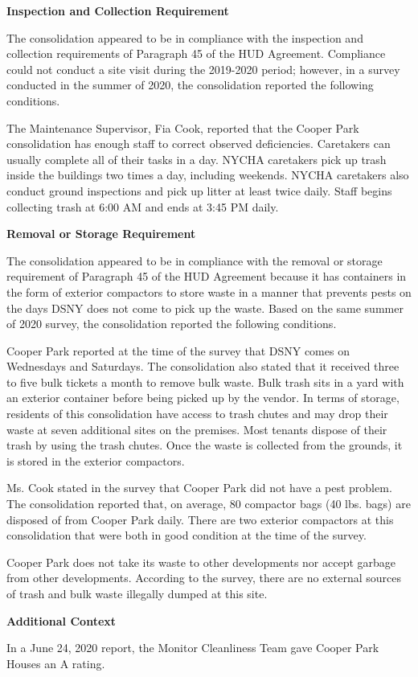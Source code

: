 

\textbf{Inspection and Collection Requirement} 

 

The consolidation appeared to be in compliance with the inspection and collection requirements of Paragraph 45 of the HUD Agreement. Compliance could not conduct a site visit during the 2019-2020 period; however, in a survey conducted in the summer of 2020, the consolidation reported the following conditions.

The Maintenance Supervisor, Fia Cook, reported that the Cooper Park consolidation has enough staff to correct observed deficiencies. Caretakers can usually complete all of their tasks in a day. NYCHA caretakers pick up trash inside the buildings two times a day, including weekends. NYCHA caretakers also conduct ground inspections and pick up litter at least twice daily. Staff begins collecting trash at 6:00 AM and ends at 3:45 PM daily.

\textbf{Removal or Storage Requirement} 

The consolidation appeared to be in compliance with the removal or storage requirement of Paragraph  45 of the HUD Agreement because it has containers in the form of exterior compactors to store waste in a manner that prevents pests on the days DSNY does not come to pick up the waste. Based on the same summer of  2020 survey, the consolidation reported the following conditions.

  

Cooper Park reported at the time of the survey that DSNY comes on Wednesdays and Saturdays. The consolidation also stated that it received three to five bulk tickets a month to remove bulk waste.  Bulk trash sits in a yard with an exterior container before being picked up by the vendor.  In terms of storage, residents of this consolidation have access to trash chutes and may drop their waste at seven additional sites on the premises. Most tenants dispose of their trash by using the trash chutes. Once the waste is collected from the grounds, it is stored in the exterior compactors.  

Ms. Cook stated in the survey that Cooper Park did not have a pest problem. The consolidation reported that, on average, 80 compactor bags (40 lbs. bags)  are disposed of from Cooper Park daily.  There are two exterior compactors at this consolidation that were both in good condition at the time of the survey. 

Cooper Park does not take its waste to other developments nor accept garbage from other developments. According to the survey, there are no external sources of trash and bulk waste illegally dumped at this site. 

\textbf{Additional Context}  

In a June 24, 2020 report, the Monitor Cleanliness Team gave Cooper Park Houses an A rating.  